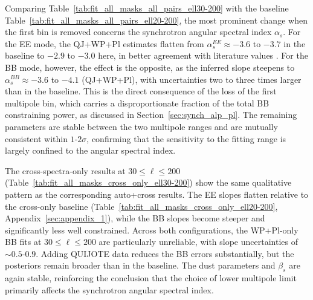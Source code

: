 Comparing Table~\ref{tab:fit_all_masks_all_pairs_ell30-200} with the baseline Table~\ref{tab:fit_all_masks_all_pairs_ell20-200}, the most prominent change when the first bin is removed concerns the synchrotron angular spectral index $\alpha_s$. For the EE mode, the QJ+WP+Pl estimates flatten from $\alpha_s^{EE} \approx -3.6$ to $-3.7$ in the baseline to $-2.9$ to $-3.0$ here, in better agreement with literature values \citep{Martire_2022, Krachmalnicoff_2018}. For the BB mode, however, the effect is the opposite, as the inferred slope steepens to $\alpha_s^{BB} \approx -3.6$ to $-4.1$ (QJ+WP+Pl), with uncertainties two to three times larger than in the baseline. This is the direct consequence of the loss of the first multipole bin, which carries a disproportionate fraction of the total BB constraining power, as discussed in Section~\ref{sec:synch_alp_pl}. The remaining parameters are stable between the two multipole ranges and are mutually consistent within $1$-$2\sigma$, confirming that the sensitivity to the fitting range is largely confined to the angular spectral index.


The cross-spectra-only results at $30 \leq \ell \leq 200$ (Table~\ref{tab:fit_all_masks_cross_only_ell30-200}) show the same qualitative pattern as the corresponding auto+cross results. The EE slopes flatten relative to the cross-only baseline (Table~\ref{tab:fit_all_masks_cross_only_ell20-200}, Appendix~\ref{sec:appendix_1}), while the BB slopes become steeper and significantly less well constrained. Across both configurations, the WP+Pl-only BB fits at $30 \leq \ell \leq 200$ are particularly unreliable, with slope uncertainties of $\sim 0.5$-$0.9$. Adding QUIJOTE data reduces the BB errors substantially, but the posteriors remain broader than in the baseline. The dust parameters and $\beta_s$ are again stable, reinforcing the conclusion that the choice of lower multipole limit primarily affects the synchrotron angular spectral index.







% 

% 

% 

% 

% 

% 

